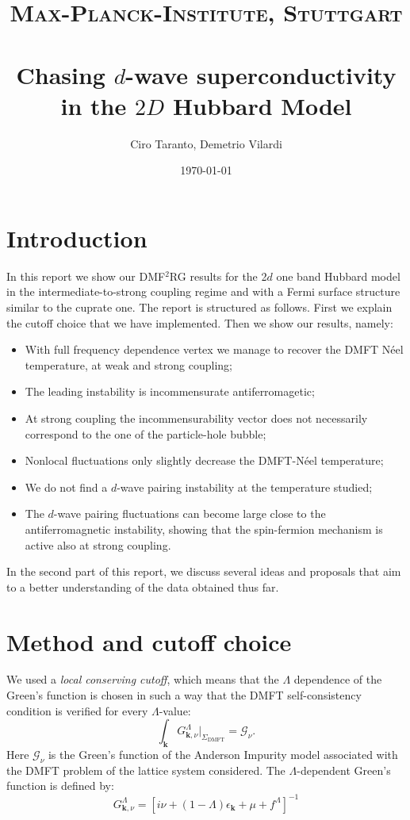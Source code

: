\documentclass[paper=a4, fontsize=11pt]{scrartcl} %
\title{	
\normalfont \normalsize 
\textsc{Max-Planck-Institute, Stuttgart} \\ [25pt] %
\horrule{0.5pt} \\[0.4cm] %
\huge Chasing $d$-wave superconductivity \\
in the $2D$ Hubbard Model %
\horrule{2pt} \\[0.5cm] %
}
\author{Ciro Taranto, Demetrio Vilardi} %
\date{\normalsize\today} %
\numberwithin{equation}{section} %
\numberwithin{figure}{section} %
\numberwithin{table}{section} %
\begin{document}
\maketitle %


\section{Introduction}
In this report we show our DMF$^2$RG results for the  2$d$ one band Hubbard model in the intermediate-to-strong coupling regime and with a Fermi surface structure similar to the cuprate one. 
The report is structured as follows. 
First we explain the cutoff choice that we have implemented. 
Then we show our results, namely: 
\begin{itemize}
\item With full frequency dependence vertex we manage to recover the DMFT N\' eel temperature, at weak and strong coupling; 
\item The leading instability is incommensurate antiferromagetic; 
\item At strong coupling the incommensurability vector does not necessarily correspond to the one of the particle-hole bubble; 
\item Nonlocal fluctuations only slightly decrease the DMFT-N\' eel temperature; 
\item We do not find a $d$-wave pairing instability at the temperature studied; 
\item The $d$-wave pairing fluctuations can become large close to the antiferromagnetic instability, showing that the spin-fermion mechanism is active also at strong coupling. 
\end{itemize} 
In the second part of this report, we discuss several ideas and proposals that aim to a better understanding of the data obtained thus far. 

\section{Method and cutoff choice}
We used a \textit{local conserving cutoff}, which means that the $\Lambda$ dependence of the Green's function is chosen in such a way that the DMFT self-consistency condition is verified for every $\Lambda$-value:
\begin{equation}
\int_{\mathbf{k}} G^\Lambda_{\mathbf{k},\nu}|_{\Sigma_{\mathrm{DMFT}}} = \mathcal{G}_{\nu}.   
\end{equation}
Here $\mathcal{G}_{\nu}$ is the Green's function of the Anderson Impurity model associated with the DMFT problem of the lattice system considered. The $\Lambda$-dependent Green's function is defined by: 
\begin{equation}
G_{\mathbf{k},\nu}^\Lambda = \left[i\nu+(1-\Lambda)\epsilon_{\mathbf{k}}+\mu +f^\Lambda \right]^{-1}
\end{equation}
\end{document}
